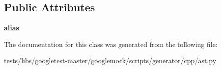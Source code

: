 \subsection*{Public Attributes}
\begin{DoxyCompactItemize}
\item 
\mbox{\label{classtests_1_1libs_1_1googletest-master_1_1googlemock_1_1scripts_1_1generator_1_1cpp_1_1ast_1_1Typedef_a2def3eeb9fdd181ece0e838907b37769}} 
{\bfseries alias}
\end{DoxyCompactItemize}


The documentation for this class was generated from the following file\+:\begin{DoxyCompactItemize}
\item 
tests/libs/googletest-\/master/googlemock/scripts/generator/cpp/ast.\+py\end{DoxyCompactItemize}
